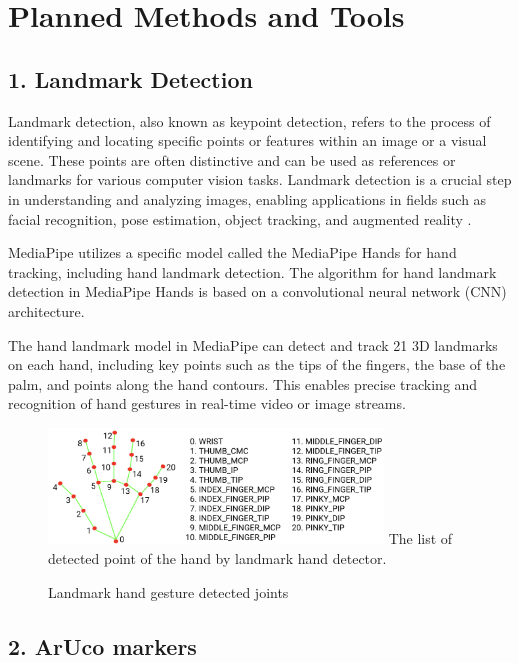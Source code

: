 \documentclass[journal]{IEEEtran}
\begin{document}
\section{Planned Methods and Tools}


\subsection*{1. Landmark Detection}
Landmark detection, also known as keypoint detection, refers to the process of identifying and locating specific points or 
features within an image or a visual scene. These points are often distinctive and can be used as references or landmarks 
for various computer vision tasks. Landmark detection is a crucial step in understanding and analyzing images, enabling applications 
in fields such as facial recognition, pose estimation, object tracking, and augmented reality \cite{lin2021ego2hands}.

MediaPipe utilizes a specific model called the MediaPipe Hands for hand tracking, including hand landmark detection. 
The algorithm for hand landmark detection in MediaPipe Hands is based on a convolutional neural network (CNN) architecture.

The hand landmark model in MediaPipe can detect and track 21 3D landmarks on each hand, including key points such as the tips 
of the fingers, the base of the palm, and points along the hand contours. This enables precise tracking and recognition of hand 
gestures in real-time video or image streams.

\begin{figure}[!t]
  \centering
  \includegraphics[width=3.5in]{photo/hand-landmarks.png}
  The list of detected point of the hand by landmark hand detector.
  \caption{Landmark hand gesture detected joints}
  \label{fig_sim}
\end{figure}

\subsection*{2. ArUco markers}
\end{document}
